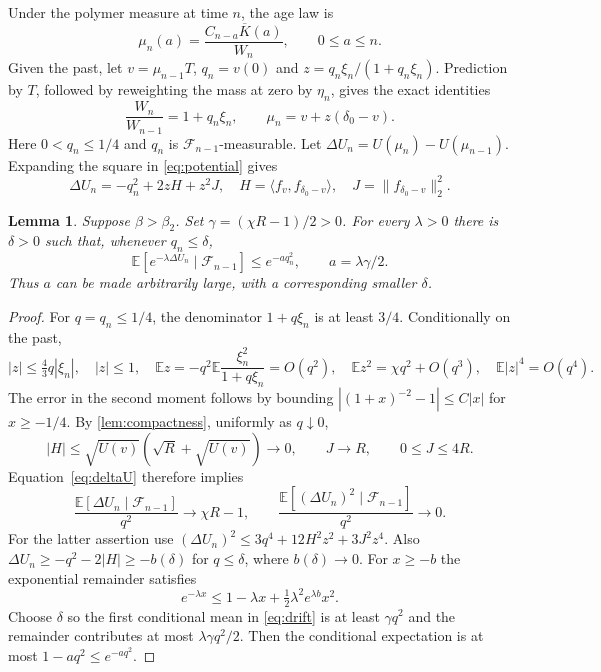 \documentclass[11pt]{article}
\newtheorem{lemma}[lemma]{Lemma}
\theoremstyle{remark}
\numberwithin{equation}{section}
\newcommand{\E}{\mathbb E}
\begin{document}
Under the polymer measure at time $n$, the age law is
\[
 \mu_n(a)=\frac{C_{n-a}\overline K(a)}{W_n},\qquad 0\le a\le n.
\]
Given the past, let $v=\mu_{n-1}T$, $q_n=v(0)$ and
$z=q_n\xi_n/(1+q_n\xi_n)$. Prediction by $T$, followed by reweighting the
mass at zero by $\eta_n$, gives the exact identities
\begin{equation}\label{eq:age-update}
 \frac{W_n}{W_{n-1}}=1+q_n\xi_n,\qquad
 \mu_n=v+z(\delta_0-v).
\end{equation}
Here $0<q_n\le1/4$ and $q_n$ is $\mathcal F_{n-1}$-measurable.
Let $\Delta U_n=U(\mu_n)-U(\mu_{n-1})$. Expanding the square in
\eqref{eq:potential} gives
\begin{equation}\label{eq:deltaU}
 \Delta U_n=-q_n^2+2zH+z^2J,
 \quad H=\langle f_v,f_{\delta_0-v}\rangle,
 \quad J=\|f_{\delta_0-v}\|_2^2.
\end{equation}

\begin{lemma}\label{lem:exponential}
Suppose $\beta>\beta_2$. Set $\gamma=(\chi R-1)/2>0$. For every
$\lambda>0$ there is $\delta>0$ such that, whenever $q_n\le\delta$,
\begin{equation}\label{eq:exponential}
 \E[e^{-\lambda\Delta U_n}\mid\mathcal F_{n-1}]
 \le e^{-a q_n^2},\qquad a=\lambda\gamma/2.
\end{equation}
Thus $a$ can be made arbitrarily large, with a corresponding smaller $\delta$.
\end{lemma}
\begin{proof}
For $q=q_n\le1/4$, the denominator $1+q\xi_n$ is at least $3/4$.
Conditionally on the past,
\[
 |z|\le\tfrac43q|\xi_n|,\quad |z|\le1,\quad
 \E z=-q^2\E\frac{\xi_n^2}{1+q\xi_n}=O(q^2),\quad
 \E z^2=\chi q^2+O(q^3),\quad \E|z|^4=O(q^4).
\]
The error in the second moment follows by bounding
$|(1+x)^{-2}-1|\le C|x|$ for $x\ge-1/4$.
By \cref{lem:compactness}, uniformly as $q\downarrow0$,
\[
 |H|\le\sqrt{U(v)}(\sqrt R+\sqrt{U(v)})\longrightarrow0,
 \qquad J\longrightarrow R,\qquad 0\le J\le4R.
\]
Equation~\eqref{eq:deltaU} therefore implies
\begin{equation}\label{eq:drift}
 \frac{\E[\Delta U_n\mid\mathcal F_{n-1}]}{q^2}\longrightarrow\chi R-1,
 \qquad
 \frac{\E[(\Delta U_n)^2\mid\mathcal F_{n-1}]}{q^2}\longrightarrow0.
\end{equation}
For the latter assertion use
$(\Delta U_n)^2\le3q^4+12H^2z^2+3J^2z^4$.
Also $\Delta U_n\ge-q^2-2|H|\ge-b(\delta)$ for $q\le\delta$,
where $b(\delta)\to0$.
For $x\ge-b$ the exponential remainder satisfies
\[
 e^{-\lambda x}\le1-\lambda x+\tfrac12\lambda^2e^{\lambda b}x^2.
\]
Choose $\delta$ so the first conditional mean in \eqref{eq:drift} is at
least $\gamma q^2$ and the remainder contributes at most
$\lambda\gamma q^2/2$. Then the conditional expectation is at most
$1-aq^2\le e^{-aq^2}$.
\end{proof}
\end{document}
